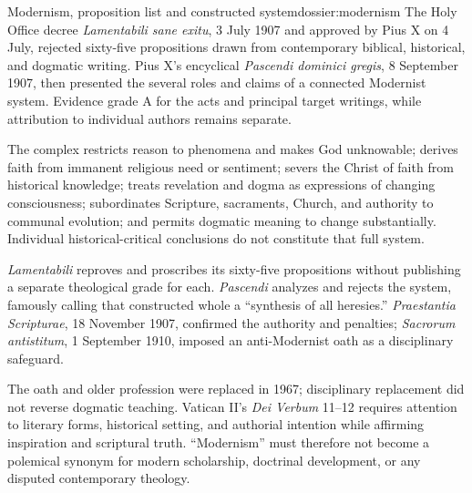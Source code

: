 \begin{heresydossier}{Modernism, proposition list and constructed system}{dossier:modernism}
\objectfield The Holy Office decree \emph{Lamentabili sane exitu}, 3 July 1907 and approved by Pius X on 4 July, rejected sixty-five propositions drawn from contemporary biblical, historical, and dogmatic writing. Pius X's encyclical \emph{Pascendi dominici gregis}, 8 September 1907, then presented the several roles and claims of a connected Modernist system. Evidence grade A for the acts and principal target writings, while attribution to individual authors remains separate.

\propositionfield The complex restricts reason to phenomena and makes God unknowable; derives faith from immanent religious need or sentiment; severs the Christ of faith from historical knowledge; treats revelation and dogma as expressions of changing consciousness; subordinates Scripture, sacraments, Church, and authority to communal evolution; and permits dogmatic meaning to change substantially. Individual historical-critical conclusions do not constitute that full system.

\responsefield \emph{Lamentabili} reproves and proscribes its sixty-five propositions without publishing a separate theological grade for each. \emph{Pascendi} analyzes and rejects the system, famously calling that constructed whole a ``synthesis of all heresies.'' \emph{Praestantia Scripturae}, 18 November 1907, confirmed the authority and penalties; \emph{Sacrorum antistitum}, 1 September 1910, imposed an anti-Modernist oath as a disciplinary safeguard.

\aftermathfield The oath and older profession were replaced in 1967; disciplinary replacement did not reverse dogmatic teaching. Vatican II's \emph{Dei Verbum} 11--12 requires attention to literary forms, historical setting, and authorial intention while affirming inspiration and scriptural truth. ``Modernism'' must therefore not become a polemical synonym for modern scholarship, doctrinal development, or any disputed contemporary theology.
\end{heresydossier}

